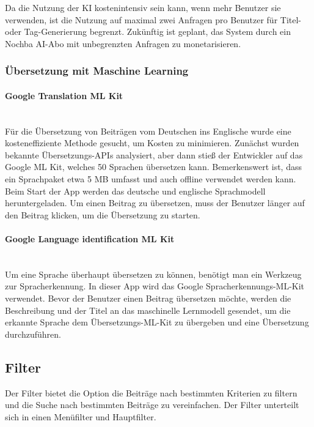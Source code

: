 Da die Nutzung der KI kostenintensiv sein kann, wenn mehr Benutzer sie verwenden, ist die Nutzung auf maximal zwei Anfragen pro Benutzer für Titel- oder Tag-Generierung begrenzt. Zukünftig ist geplant, das System durch ein Nochba AI-Abo mit unbegrenzten Anfragen zu monetarisieren.

\subsubsection{Übersetzung mit Maschine Learning}

\paragraph{Google Translation ML Kit}\mbox{} \\

Für die Übersetzung von Beiträgen vom Deutschen ins Englische wurde eine kosteneffiziente Methode gesucht, um Kosten zu minimieren. Zunächst wurden bekannte Übersetzungs-APIs analysiert, aber dann stieß der Entwickler auf das Google ML Kit, welches 50 Sprachen übersetzen kann. Bemerkenswert ist, dass ein Sprachpaket etwa 5 MB umfasst und auch offline verwendet werden kann. Beim Start der App werden das deutsche und englische Sprachmodell heruntergeladen. Um einen Beitrag zu übersetzen, muss der Benutzer länger auf den Beitrag klicken, um die Übersetzung zu starten.



\paragraph{Google Language identification ML Kit}\mbox{} \\

Um eine Sprache überhaupt übersetzen zu können, benötigt man ein Werkzeug zur Spracherkennung. In dieser App wird das Google Spracherkennungs-ML-Kit verwendet. Bevor der Benutzer einen Beitrag übersetzen möchte, werden die Beschreibung und der Titel an das maschinelle Lernmodell gesendet, um die erkannte Sprache dem Übersetzungs-ML-Kit zu übergeben und eine Übersetzung durchzuführen.


\subsection{Filter}
Der Filter bietet die Option die Beiträge nach bestimmten Kriterien zu filtern und die Suche nach bestimmten Beiträge zu vereinfachen. Der Filter unterteilt sich in einen Menüfilter und Hauptfilter.

